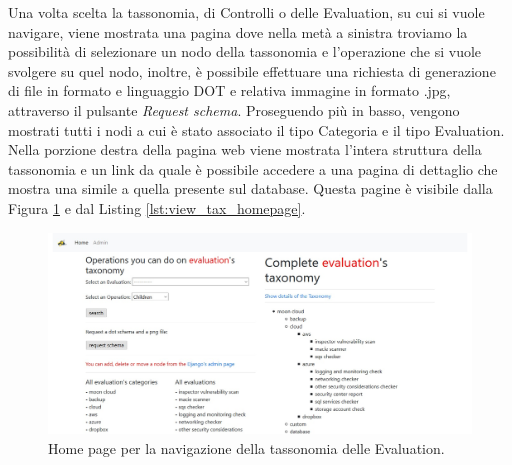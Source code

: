 %
Una volta scelta la tassonomia, di Controlli o delle Evaluation, su cui si vuole navigare, viene mostrata una pagina dove nella metà a sinistra 
troviamo la possibilità di selezionare un nodo della tassonomia e l'operazione che si vuole svolgere su quel nodo, inoltre, è possibile effettuare 
una richiesta di generazione di file in formato e linguaggio DOT e relativa immagine in formato .jpg, attraverso il pulsante \textit{Request schema}. 
Proseguendo più in basso, vengono mostrati tutti i nodi a cui è stato associato il tipo Categoria e il tipo Evaluation. Nella porzione destra della 
pagina web viene mostrata l'intera struttura della tassonomia e un link da quale è possibile accedere a una pagina di dettaglio che mostra una 
simile a quella presente sul database. Questa pagine è visibile dalla Figura \ref{fig:MCRS_taxindex} e dal Listing \ref{lst:view_tax_homepage}.\hfill\break
%
\begin{figure}[ht!]
    \includegraphics[scale=0.4]{images/MCRS_taxindex.jpg}
    \caption{Home page per la navigazione della tassonomia delle Evaluation.}
    \label{fig:MCRS_taxindex}
\end{figure}
%
\lstset{style=python_code_style}
